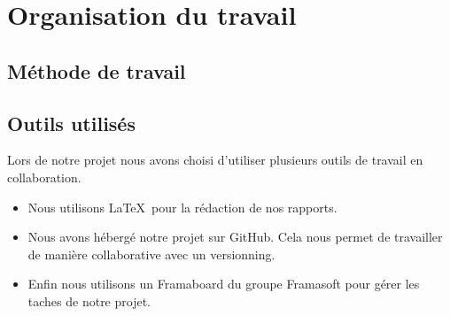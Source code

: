 
\chapter{Organisation du travail}


 \section{Méthode de travail}









\section{Outils utilisés}

Lors de notre projet nous avons choisi d'utiliser plusieurs outils de travail en collaboration.

\begin{itemize}
\item Nous utilisons \LaTeX~pour la rédaction de nos rapports.
\item Nous avons hébergé notre projet sur GitHub. Cela nous permet de travailler de manière collaborative avec un versionning.
\item Enfin nous utilisons un Framaboard du groupe Framasoft pour gérer les taches de notre projet.
\end{itemize}

